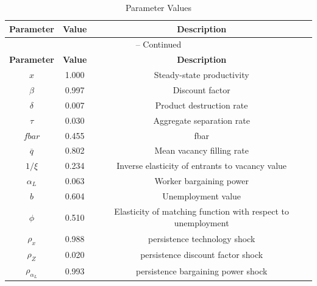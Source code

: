 \begin{center}
\begin{longtable}{ccc}
\caption{Parameter Values}\\%
\toprule%
\multicolumn{1}{c}{\textbf{Parameter}} &
\multicolumn{1}{c}{\textbf{Value}} &
 \multicolumn{1}{c}{\textbf{Description}}\\%
\midrule%
\endfirsthead
\multicolumn{3}{c}{{\tablename} \thetable{} -- Continued}\\%
\midrule%
\multicolumn{1}{c}{\textbf{Parameter}} &
\multicolumn{1}{c}{\textbf{Value}} &
  \multicolumn{1}{c}{\textbf{Description}}\\%
\midrule%
\endhead
${x}$ 	 & 	 1.000 	 & 	 Steady-state productivity\\
${\beta}$ 	 & 	 0.997 	 & 	 Discount factor\\
${\delta}$ 	 & 	 0.007 	 & 	 Product destruction rate\\
${\tau}$ 	 & 	 0.030 	 & 	 Aggregate separation rate\\
$fbar$ 	 & 	 0.455 	 & 	 fbar\\
${\overline{q}}$ 	 & 	 0.802 	 & 	 Mean vacancy filling rate\\
${1/\xi}$ 	 & 	 0.234 	 & 	 Inverse elasticity of entrants to vacancy value\\
$\alpha_L$ 	 & 	 0.063 	 & 	 Worker bargaining power\\
$b$ 	 & 	 0.604 	 & 	 Unemployment value\\
$\phi$ 	 & 	 0.510 	 & 	 Elasticity of matching function with respect to unemployment\\
${\rho_x}$ 	 & 	 0.988 	 & 	 persistence technology shock\\
${\rho_Z}$ 	 & 	 0.020 	 & 	 persistence discount factor shock\\
${\rho_{\alpha_L}}$ 	 & 	 0.993 	 & 	 persistence bargaining power shock\\
\bottomrule%
\end{longtable}
\end{center}
